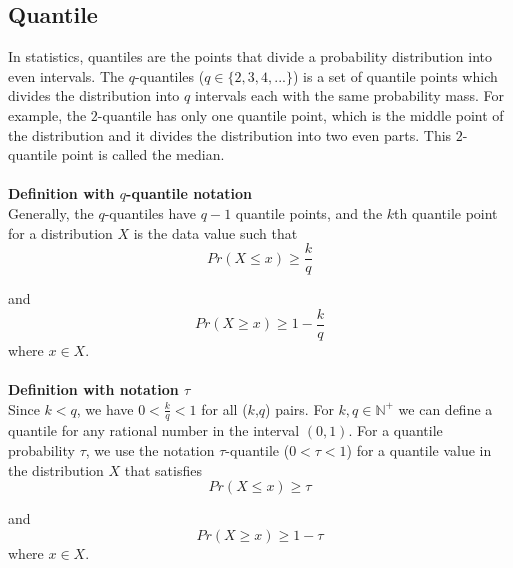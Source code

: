 \subsection{Quantile}
\label{subsec: quant}

In statistics, quantiles are the points that divide a probability distribution into even intervals.
The $q$-quantiles ($q \in \{2,3,4,...\}$) is a set of quantile points which divides the distribution into $q$ intervals each with the same probability mass.
For example, the $2$-quantile has only one quantile point, which is the middle point of the distribution
and it divides the distribution into two even parts. This $2$-quantile point is called the median.
        \\\\
    \textbf{Definition with $q$-quantile notation} \\
    Generally, the $q$-quantiles have $q-1$ quantile points, and the $k$th quantile point for a 
    distribution $X$ is the data value such that%
    \begin{equation}
        Pr(X \leq x) \geq \frac{k}{q}
    \end{equation}
    
    and%
    \begin{equation}
        Pr(X \geq x) \geq 1 - \frac{k}{q}
    \end{equation}
    where $x \in X$.
    \\\\
    \textbf{Definition with notation $\tau$}\\
    Since $k < q$, we have $0 < \frac{k}{q} < 1$ for all ($k$,$q$) pairs. For $k, q \in \mathbb{N}^+$ we can define a quantile for any rational number in the interval $(0,1)$. For a quantile probability $\tau$, we use the notation $\tau$-quantile ($0 < \tau < 1$) for a quantile value in the distribution $X$ that satisfies%
    \begin{equation}
        Pr(X \leq x) \geq \tau
    \end{equation}
    
    and%
    \begin{equation}
        Pr(X \geq x) \geq 1 - \tau
    \end{equation}
    where $x \in X$.


